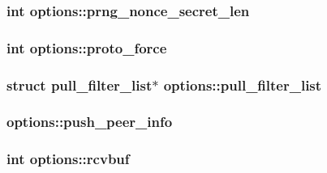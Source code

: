 \subsubsection[{prng\+\_\+nonce\+\_\+secret\+\_\+len}]{\setlength{\rightskip}{0pt plus 5cm}int options\+::prng\+\_\+nonce\+\_\+secret\+\_\+len}\label{structoptions_a3d0e034a7cdda86ad66beee637423a74}
\hypertarget{structoptions_a0ee67574c48f7e866b0e292485f733f2}{}
\subsubsection[{proto\+\_\+force}]{\setlength{\rightskip}{0pt plus 5cm}int options\+::proto\+\_\+force}\label{structoptions_a0ee67574c48f7e866b0e292485f733f2}
\hypertarget{structoptions_ac0019bc66757add36d108772a29b53f3}{}
\subsubsection[{pull\+\_\+filter\+\_\+list}]{\setlength{\rightskip}{0pt plus 5cm}struct {\bf pull\+\_\+filter\+\_\+list}$\ast$ options\+::pull\+\_\+filter\+\_\+list}\label{structoptions_ac0019bc66757add36d108772a29b53f3}
\hypertarget{structoptions_a17009cf5cdc04448103ca126317d5af7}{}
\subsubsection[{push\+\_\+peer\+\_\+info}]{ options\+::push\+\_\+peer\+\_\+info}\label{structoptions_a17009cf5cdc04448103ca126317d5af7}
\hypertarget{structoptions_a0536fdadf7c9e61bfe97e269172bbf3a}{}
\subsubsection[{rcvbuf}]{\setlength{\rightskip}{0pt plus 5cm}int options\+::rcvbuf}\label{structoptions_a0536fdadf7c9e61bfe97e269172bbf3a}
\hypertarget{structoptions_aeea9c1239f3809521b0dde3bcc622fc3}{}
